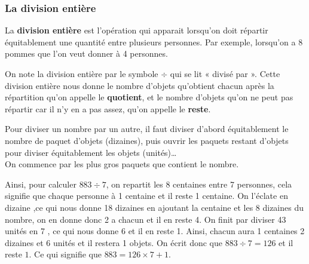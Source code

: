 \subsubsection{La division entière}
La \textbf{division entière} est l'opération qui apparait lorsqu'on doit répartir équitablement une quantité entre plusieurs personnes. Par exemple, lorsqu'on a 8 pommes que l'on veut donner à 4 personnes. 

On note la division entière par le symbole $\div$ qui se lit « divisé par ». Cette division entière nous donne le nombre d'objets qu'obtient chacun après la répartition qu'on appelle le \textbf{quotient}, et le nombre d'objets qu'on ne peut pas répartir car il n'y en a pas assez, qu'on appelle le \textbf{reste}.

Pour diviser un nombre par un autre, il faut diviser d'abord équitablement le nombre de paquet d'objets (dizaines), puis ouvrir les paquets restant d'objets pour diviser équitablement les objets (unités)\dots \\
On commence par les plus gros paquets que contient le nombre. 

Ainsi, pour calculer $883 \div 7$, on repartit les 8 centaines entre 7 personnes, cela signifie que chaque personne à 1 centaine et il reste 1 centaine. On l'éclate en dizaine ,ce qui nous donne 18 dizaines en ajoutant la centaine et les 8 dizaines du nombre, on en donne donc 2 a chacun et il en reste 4. On finit par diviser 43 unités en 7 , ce qui nous donne 6 et il en reste 1. Ainsi, chacun aura 1 centaines 2 dizaines et 6 unités et il restera 1 objets. On écrit donc que $883 \div 7 = 126$ et il reste $1$. Ce qui signifie que $883 = 126\times 7+1$.
